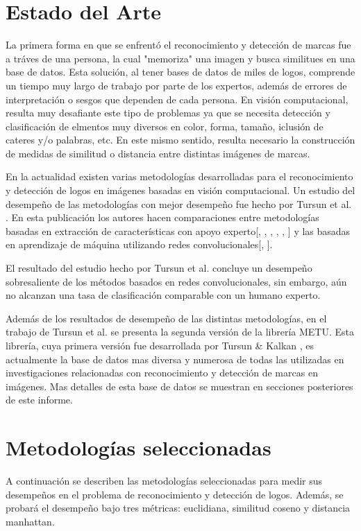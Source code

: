 \documentclass[conference]{IEEEtran}
\begin{document}
\section{Estado del Arte}
La primera forma en que se enfrentó el reconocimiento y detección de marcas fue a tráves de una persona, la cual "memoriza" una imagen y busca similitues en una base de datos. Esta solución, al tener bases de datos de miles de logos, comprende un tiempo muy largo de trabajo por parte de los expertos, además de errores de interpretación o sesgos que dependen de cada persona.
En visión computacional, resulta muy desafiante este tipo de problemas ya que se necesita detección y clasificación de elmentos muy diversos en color, forma, tamaño, iclusión de cateres y/o palabras, etc. En este mismo sentido, resulta necesario la construcción de medidas de similitud o distancia entre distintas imágenes de marcas.

En la actualidad existen varias metodologías desarrolladas para el reconocimiento y detección de logos en imágenes basadas en visión computacional. Un estudio del desempeño de las metodologías con mejor desempeño fue hecho por Tursun et al. \cite{metuV2}. En esta publicación los autores hacen comparaciones entre metodologías basadas en extracción de características con apoyo experto[\cite{bowd}, \cite{colorHist}, \cite{GIST}, \cite{kpoint}, \cite{LBP}, \cite{shape}] y las basadas en aprendizaje de máquina utilizando redes convolucionales[\cite{cnn1}, \cite{cnn2}]. 

El resultado del estudio hecho por Tursun et al. \cite{metuV2} concluye un desempeño sobresaliente de los métodos basados en redes convolucionales, sin embargo, aún no alcanzan una tasa de clasificación comparable con un humano experto. 

Además de los resultados de desempeño de las distintas metodologías, en el trabajo de Tursun et al. \cite{metuV2} se presenta la segunda versión de la librería METU. Esta librería, cuya primera versión fue desarrollada por Tursun \& Kalkan \cite{metuV1}, es actualmente la base de datos mas diversa y numerosa de todas las utilizadas en investigaciones relacionadas con reconocimiento y detección de marcas en imágenes. Mas detalles de esta base de datos se muestran en secciones posteriores de este informe. 


\section{Metodologías seleccionadas}
A continuación se describen las metodologías seleccionadas para medir sus desempeños en el problema de reconocimiento y detección de logos. Además, se probará el desempeño bajo tres métricas: euclidiana, similitud coseno y distancia manhattan.
\end{document}
